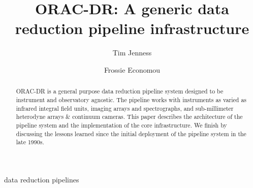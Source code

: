 \documentclass[final,authoryear,5p,times,twocolumn]{elsarticle}
\begin{document}
\begin{frontmatter}



\title{ORAC-DR: A generic data reduction pipeline infrastructure}


\author[jac]{Tim Jenness}
\author[jac]{Frossie Economou}


\address[jac]{Joint Astronomy Centre, 660 N.\ A`oh\=ok\=u Place, Hilo, HI
  96720, USA}

\begin{abstract}

  ORAC-DR is a general purpose data reduction pipeline system designed
  to be instrument and observatory agnostic. The pipeline works with
  instruments as varied as infrared integral field units, imaging
  arrays and spectrographs, and sub-millimeter heterodyne arrays \&
  continuum cameras. This paper describes the architecture of the
  pipeline system and the implementation of the core
  infrastructure. We finish by discussing the lessons learned since
  the initial deployment of the pipeline system in the late 1990s.

\end{abstract}

\begin{keyword}


data reduction pipelines

\end{keyword}

\end{frontmatter}
\end{document}
